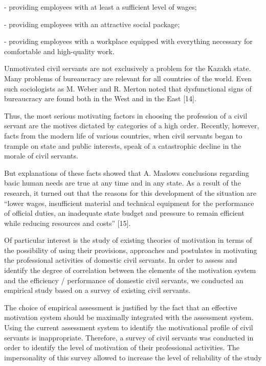 \begin{multicols}{2}
- providing employees with at least a sufficient level of wages;

- providing employees with an attractive social package;

- providing employees with a workplace equipped with everything
necessary for comfortable and high-quality work.

Unmotivated civil servants are not exclusively a problem for the Kazakh
state. Many problems of bureaucracy are relevant for all countries of
the world. Even such sociologists as M. Weber and R. Merton noted that
dysfunctional signs of bureaucracy are found both in the West and in the
East {[}14{]}.

Thus, the most serious motivating factors in choosing the profession of
a civil servant are the motives dictated by categories of a high order.
Recently, however, facts from the modern life of various countries, when
civil servants began to trample on state and public interests, speak of
a catastrophic decline in the morale of civil servants.

But explanations of these facts showed that A. Maslow\textquotesingle s
conclusions regarding basic human needs are true at any time and in any
state. As a result of the research, it turned out that the reasons for
this development of the situation are ``lower wages, insufficient
material and technical equipment for the performance of official duties,
an inadequate state budget and pressure to remain efficient while
reducing resources and costs'' {[}15{]}.

Of particular interest is the study of existing theories of motivation
in terms of the possibility of using their provisions, approaches and
postulates in motivating the professional activities of domestic civil
servants. In order to assess and identify the degree of correlation
between the elements of the motivation system and the efficiency /
performance of domestic civil servants, we conducted an empirical study
based on a survey of existing civil servants.

The choice of empirical assessment is justified by the fact that an
effective motivation system should be maximally integrated with the
assessment system. Using the current assessment system to identify the
motivational profile of civil servants is inappropriate. Therefore, a
survey of civil servants was conducted in order to identify the level of
motivation of their professional activities. The impersonality of this
survey allowed to increase the level of reliability of the study


\end{multicols}

